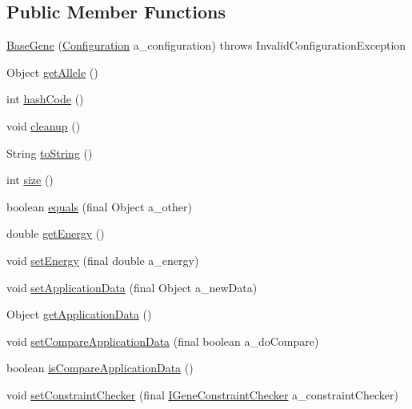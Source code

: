 \subsection*{Public Member Functions}
\begin{DoxyCompactItemize}
\item 
\hyperlink{classorg_1_1jgap_1_1_base_gene_acea53de5bb68978322967e8019607f24}{Base\-Gene} (\hyperlink{classorg_1_1jgap_1_1_configuration}{Configuration} a\-\_\-configuration)  throws Invalid\-Configuration\-Exception 
\item 
Object \hyperlink{classorg_1_1jgap_1_1_base_gene_a35e754e8e217bdd26962e1c3c31d0169}{get\-Allele} ()
\item 
int \hyperlink{classorg_1_1jgap_1_1_base_gene_af842a106d90ca973956f560ae448464e}{hash\-Code} ()
\item 
void \hyperlink{classorg_1_1jgap_1_1_base_gene_a569b99cf460d27d2c1acbea2b7775975}{cleanup} ()
\item 
String \hyperlink{classorg_1_1jgap_1_1_base_gene_a935dfec06cb77bff0d2a45859d6a35b7}{to\-String} ()
\item 
int \hyperlink{classorg_1_1jgap_1_1_base_gene_a26c00775111b327b178288164ed9c667}{size} ()
\item 
boolean \hyperlink{classorg_1_1jgap_1_1_base_gene_a9fb0e302ae57ee3f2f5d1ee08a75bf43}{equals} (final Object a\-\_\-other)
\item 
double \hyperlink{classorg_1_1jgap_1_1_base_gene_a48f71c4c1282de2ca2cf8f4009c4615a}{get\-Energy} ()
\item 
void \hyperlink{classorg_1_1jgap_1_1_base_gene_afb39fbd8997971a140a9a4380ceecc4a}{set\-Energy} (final double a\-\_\-energy)
\item 
void \hyperlink{classorg_1_1jgap_1_1_base_gene_afeb9a5f42018c057c8197fb0e7d57354}{set\-Application\-Data} (final Object a\-\_\-new\-Data)
\item 
Object \hyperlink{classorg_1_1jgap_1_1_base_gene_a0520139dc694dc6034aeb631ae7d70bd}{get\-Application\-Data} ()
\item 
void \hyperlink{classorg_1_1jgap_1_1_base_gene_adad4ccd46efd7b2a3dc81bd0ba0c410c}{set\-Compare\-Application\-Data} (final boolean a\-\_\-do\-Compare)
\item 
boolean \hyperlink{classorg_1_1jgap_1_1_base_gene_acd6431c06c81bc03b4abbe32e4d9d8ef}{is\-Compare\-Application\-Data} ()
\item 
void \hyperlink{classorg_1_1jgap_1_1_base_gene_a334db8a543f3008719d78ee219826b65}{set\-Constraint\-Checker} (final \hyperlink{interfaceorg_1_1jgap_1_1_i_gene_constraint_checker}{I\-Gene\-Constraint\-Checker} a\-\_\-constraint\-Checker)

\end{DoxyCompactItemize}
